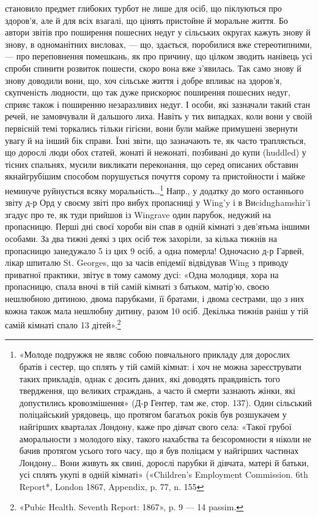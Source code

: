 \parcont{}  %
становило предмет глибоких турбот не лише для осіб, що піклуються
про здоров’я, але й для всіх взагалі, що цінять пристойне
й моральне життя. Бо автори звітів про поширення пошесних
недуг у сільських округах кажуть знову й знову, в одноманітних
висловах, — що, здається, поробилися вже стереотипними, — про
переповнення помешкань, як про причину, що цілком зводить
нанівець усі спроби спинити розвиток пошести, скоро вона вже
з’явилась. Так само знову й знову доводили вони, що, хоч сільське
життя і добре впливає на здоров’я, скупченість людности,
що так дуже прискорює поширення пошесних недуг, сприяє
також і поширенню незаразливих недуг. І особи, які зазначали
такий стан речей, не замовчували й дальшого лиха. Навіть у тих
випадках, коли вони у своїй первісній темі торкались тільки
гігієни, вони були майже примушені звернути увагу й на інший
бік справи. Їхні звіти, що зазначають те, як часто трапляється, що
дорослі люди обох статей, жонаті й нежонаті, позбивані до купи
(huddled) у тісних спальнях, мусили викликати переконання,
що серед описаних обставин якнайгрубішим способом порушується
почуття сорому та пристойности і майже неминуче руйнується
всяку моральність\dots{}\footnote{
«Молоде подружжя не являє собою повчального прикладу для
дорослих братів і сестер, що сплять у тій самій кімнат: і хоч не можна
зареєструвати таких прикладів, однак є досить даних, які доводять правдивість
того твердження, що великих страждань, а часто й смерти зазнають
жінки, які допустились кровозмішення» (Д-р Гентер, там же, стор. 137).
Один сільський поліцайський урядовець, що протягом багатьох років
був розшукачем у найгірших кварталах Лондону, каже про дівчат свого
села: «Такої грубої аморальности з молодого віку, такого нахабства
та безсоромности я ніколи не бачив протягом усього того часу, що я був
поліцаєм у найгірших частинах Лондону\dots{} Вони живуть як свині, дорослі
парубки й дівчата, матері й батьки, усі сплять укупі в одній кімнаті»
(«Children’s Employment Commission. 6th Report*, London 1867, Appendix,
p. 77, n. 155
} Напр., у додатку до мого останнього звіту
д-р Орд у своєму звіті про вибух пропасниці у Wing’y і в Виcidnghamshir’i
згадує про те, як туди прийшов із Wingrave один
парубок, недужий на пропасницю. Перші дні своєї хороби він
спав в одній кімнаті з дев’ятьма іншими особами. За два тижні
деякі з цих осіб теж захоріли, за кілька тижнів на пропасницю
занедужало 5 із цих 9 осіб, а одна померла! Одночасно
д-р Гарвей, лікар шпиталю St. Georges, що за часів епідемії відвідував
Wing з приводу приватної практики, звітує в тому самому
дусі: «Одна молодиця, хора на пропасницю, спала вночі
в тій самій кімнаті з батьком, матір’ю, своєю нешлюбною дитиною,
двома парубками, її братами, і двома сестрами, що з них
кожна також мала нешлюбну дитину, разом 10 осіб. Декілька
тижнів раніш у тій самій кімнаті спало 13 дітей».\footnote{
«Pubic Health. Seventh Report: 1867», p. 9 — 14 passim.
}

